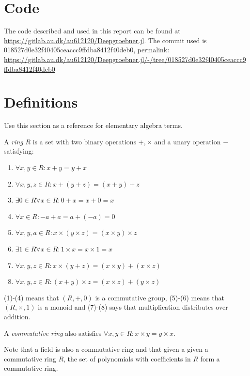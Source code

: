 \documentclass{article}
\theoremstyle{changedot}
\theoremstyle{changedotbreak}
\theoremstyle{nonumberplain}
\begin{document}
\printbibliography

\appendix
\section{Code}
The code described and used in this report can be found at \url{https://gitlab.au.dk/au612120/Deepgroebner.jl}. The commit used is 018527d0e32f40405ceaccc9ffdba8412f40deb0, permalink: \url{https://gitlab.au.dk/au612120/Deepgroebner.jl/-/tree/018527d0e32f40405ceaccc9ffdba8412f40deb0}

\section{Definitions}
Use this section as a reference for elementary algebra terms.

\begin{definition}
  A \emph{ring} $R$ is a set with two binary operations $+, \times$ and a unary operation $-$ satisfying:
  
  \begin{enumerate}
    \item $\forall x, y \in R: x + y = y + x$
    \item $\forall x, y, z \in R: x + (y + z) = (x + y) + z$
    \item $\exists 0 \in R \forall x \in R : 0 + x = x + 0 = x$
    \item $\forall x \in R: -a + a = a + (-a) = 0$
    \item $\forall x, y, a \in R: x \times (y \times z) = (x \times y) \times z$
    \item $\exists 1 \in R \forall x \in R : 1 \times x = x \times 1 = x$
    \item $\forall x, y, z \in R: x \times (y + z) = (x \times y) + (x \times z)$
    \item $\forall x, y, z \in R: (x + y) \times z = (x \times z) + (y \times z)$
  \end{enumerate}

  (1)-(4) means that $(R, +, 0)$ is a commutative group, (5)-(6) means that $(R, \times, 1)$ is a monoid and (7)-(8) says that multiplication distributes over addition.

  A \emph{commutative ring} also satisfies $\forall x, y \in R: x \times y = y \times x$.
\end{definition}

Note that a field is also a commutative ring and that given a given a commutative ring $R$, the set of polynomials with coefficients in $R$ form a commutative ring.
\end{document}
